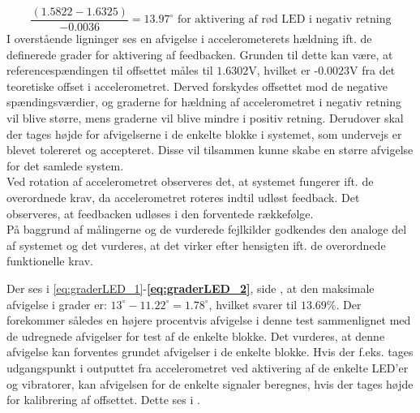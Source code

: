 \begin{equation}\label{eq:graderLED_1}
\dfrac{(1.5822 - 1.6325)}{-0.0036} = 13.97^{\circ}\text{ for aktivering af rød LED i negativ retning}
\end{equation}
\noindent I overstående ligninger ses en afvigelse i accelerometerets hældning ift. de definerede grader for aktivering af feedbacken. Grunden til dette kan være, at referencespændingen til offsettet måles til $1.6302$V, hvilket er -$0.0023$V fra det teoretiske offset i accelerometret. Derved forskydes offsettet mod de negative spændingsværdier, og graderne for hældning af accelerometret i negativ retning vil blive større, mens graderne vil blive mindre i positiv retning. Derudover skal der tages højde for afvigelserne i de enkelte blokke i systemet, som undervejs er blevet tolereret og accepteret. Disse vil tilsammen kunne skabe en større afvigelse for det samlede system. \\
Ved rotation af accelerometret observeres det, at systemet fungerer ift. de overordnede krav, da accelerometret roteres indtil udløst feedback. Det observeres, at feedbacken udløses i den forventede rækkefølge.\\
På baggrund af målingerne og de vurderede fejlkilder godkendes den analoge del af systemet og det vurderes, at det virker efter hensigten ift. de overordnede funktionelle krav.

Der ses i \eqref{eq:graderLED_1}-\textbf{\ref{eq:graderLED_2}}, side \pageref{eq:graderLED_1}, at den maksimale afvigelse i grader er: $13^{\circ} - 11.22^{\circ} = 1.78^{\circ}$, hvilket svarer til $13.69\%$. Der forekommer således en højere procentvis afvigelse i denne test sammenlignet med de udregnede afvigelser for test af de enkelte blokke. Det vurderes, at denne afvigelse kan forventes grundet afvigelser i de enkelte blokke. Hvis der f.eks. tages udgangspunkt i outputtet fra accelerometret ved aktivering af de enkelte LED'er og vibratorer, kan afvigelsen for de enkelte signaler beregnes, hvis der tages højde for kalibrering af offsettet. Dette ses i .

